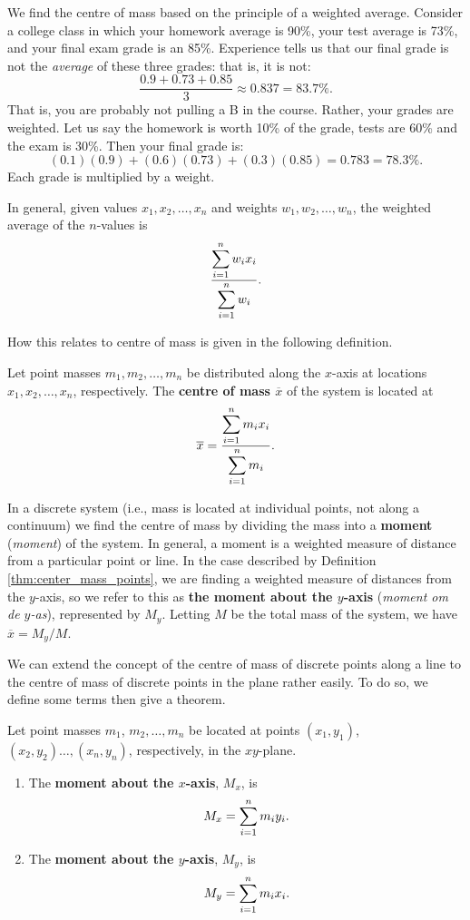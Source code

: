 We find the centre of mass based on the principle of a weighted average. Consider a college class in which your homework average is 90\%, your test average is 73\%, and your final exam grade is an 85\%. Experience tells us that our final grade is not the \textit{average} of these three grades: that is, it is not:
$$\frac{0.9+0.73+0.85}{3} \approx 0.837 = 83.7\text{\%}.$$
That is, you are probably not pulling a B in the course. Rather, your grades are weighted. Let us say the homework is worth 10\% of the grade, tests are 60\% and the exam is 30\%. Then your final grade is:
$$(0.1)(0.9) + (0.6)(0.73)+(0.3)(0.85) = 0.783 = 78.3\text{\%}.$$
Each grade is multiplied by a weight. 

In general, given values $x_1,x_2,\ldots,x_n$ and weights $w_1,w_2,\ldots,w_n$, the weighted average of the $n$-values is
$$\dfrac{\displaystyle\sum_{i=1}^n w_ix_i}{\displaystyle\sum_{i=1}^n w_i}.$$

How this relates to centre of mass is given in the following definition.

\begin{definition}\label{thm:center_mass_points}
Let point masses $m_1,m_2,\ldots,m_n$ be distributed along the $x$-axis at locations $x_1,x_2,\ldots,x_n$, respectively. The \textbf{centre of mass $\overline{x}$} of the system is located at
$$\overline{x} = \dfrac{\displaystyle\sum_{i=1}^nm_ix_i}{\displaystyle\sum_{i=1}^n m_i}.$$
\end{definition}

In a discrete system (i.e., mass is located at individual points, not along a continuum) we find the centre of mass by dividing the mass into a \textbf{moment} (\textit{moment}) of the system. In general, a moment is a weighted measure of distance from a particular point or line. In the case described by Definition \ref{thm:center_mass_points}, we are finding a weighted measure of distances from the $y$-axis, so we refer to this as \textbf{the moment about the $y$-axis} (\textit{moment om de $y$-as}), represented by $M_y$.  Letting $M$ be the total mass of the system, we have  $\overline{x} = M_y/M$. 

We can extend the concept of the centre of mass of discrete points along a line to the centre of mass of discrete points in the plane rather easily. To do so, we define some terms then give a theorem.


\begin{definition}\label{def:moment}
Let point masses $m_1$, $m_2,\ldots,m_n$ be located at points $(x_1,y_1)$, $(x_2,y_2)\ldots,(x_n,y_n)$, respectively, in the $xy$-plane. 
\begin{enumerate}[align=left]
	\item The \textbf{moment about the $x$-axis}, $M_x$, is 
	$$\displaystyle M_x = \sum_{i=1}^n m_iy_i.$$
	\item The \textbf{moment about the $y$-axis}, $M_y$, is 
	$$\displaystyle M_y = \sum_{i=1}^n m_ix_i.$$
	\end{enumerate}
\end{definition}

